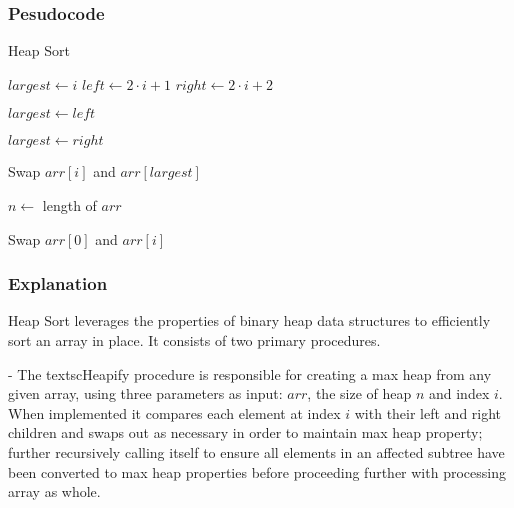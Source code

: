 \documentclass{article}
\begin{document}
\subsubsection{Pesudocode}


\begin{algorithm}
\caption{Heap Sort}
\begin{algorithmic}[1]
    \State $largest \gets i$
    \State $left \gets 2 \cdot i + 1$
    \State $right \gets 2 \cdot i + 2$
    
        \State $largest \gets left$
    \EndIf
    
        \State $largest \gets right$
    \EndIf
    
        \State Swap $arr[i]$ and $arr[largest]$
        \State {}
    \EndIf
\EndProcedure

    \State $n \gets$ length of $arr$
    
        \State {}
    \EndFor
    
        \State Swap $arr[0]$ and $arr[i]$
        \State {}
    \EndFor
\EndProcedure

\end{algorithmic}
\end{algorithm}

\subsubsection{Explanation}


Heap Sort leverages the properties of binary heap data structures to efficiently sort an array in place. It consists of two primary procedures.

- The textscHeapify procedure is responsible for creating a max heap from any given array, using three parameters as input: $arr$, the size of heap $n$ and index $i$. When implemented it compares each element at index $i$ with their left and right children and swaps out as necessary in order to maintain max heap property; further recursively calling itself to ensure all elements in an affected subtree have been converted to max heap properties before proceeding further with processing array as whole.
\end{document}
